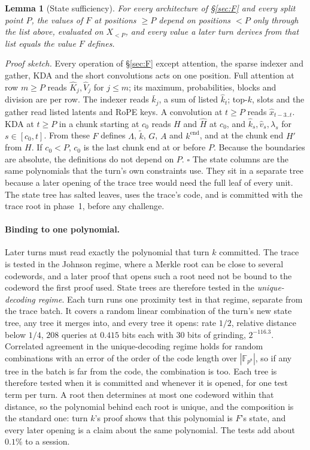 \documentclass[11pt]{article}
\newcommand{\F}{\mathbb{F}}
\newcommand{\Fo}{\F_{p^8}}
\newtheorem{lemma}{Lemma}
\begin{document}
\begin{lemma}[State sufficiency]
\label{lem:suff}
For every architecture of \S\ref{sec:F} and every split point \(P\), the values of \(F\) at positions \(\ge P\) depend on positions \(< P\) only through the list above, evaluated on \(X_{<P}\), and every value a later turn derives from that list equals the value \(F\) defines.
\end{lemma}
\noindent\emph{Proof sketch.}
Every operation of \S\ref{sec:F} except attention, the sparse indexer and gather, KDA and the short convolutions acts on one position.
Full attention at row \(m \ge P\) reads \(\hat K_j, \hat V_j\) for \(j \le m\); its maximum, probabilities, blocks and division are per row.
The indexer reads \(\bar k_j\), a sum of listed \(\hat k_t\); top-\(k\), slots and the gather read listed latents and RoPE keys.
A convolution at \(t \ge P\) reads \(\hat x_{t-3..t}\).
KDA at \(t \ge P\) in a chunk starting at \(c_0\) reads \(H\) and \(\hat H\) at \(c_0\), and \(\hat k_s, \hat v_s, \lambda_s\) for \(s \in [c_0, t]\). From these \(F\) defines \(\Lambda\), \(\tilde k\), \(G\), \(A\) and \(k^{\mathrm{end}}\), and at the chunk end \(H'\) from \(H\).
If \(c_0 < P\), \(c_0\) is the last chunk end at or before \(P\).
Because the boundaries are absolute, the definitions do not depend on \(P\). \(\square\)
The state columns are the same polynomials that the turn's own constraints use.
They sit in a separate tree because a later opening of the trace tree would need the full leaf of every unit.
The state tree has salted leaves, uses the trace's code, and is committed with the trace root in phase~1, before any challenge.

\paragraph{Binding to one polynomial.}
Later turns must read exactly the polynomial that turn \(k\) committed.
The trace is tested in the Johnson regime, where a Merkle root can be close to several codewords, and a later proof that opens such a root need not be bound to the codeword the first proof used.
State trees are therefore tested in the \emph{unique-decoding regime}.
Each turn runs one proximity test in that regime, separate from the trace batch. It covers a random linear combination of the turn's new state tree, any tree it merges into, and every tree it opens: rate \(1/2\), relative distance below \(1/4\), \(208\) queries at \(0.415\) bits each with \(30\) bits of grinding, \(2^{-116.3}\).
Correlated agreement in the unique-decoding regime holds for random combinations with an error of the order of the code length over \(|\Fo|\), so if any tree in the batch is far from the code, the combination is too.
Each tree is therefore tested when it is committed and whenever it is opened, for one test term per turn.
A root then determines at most one codeword within that distance, so the polynomial behind each root is unique, and the composition is the standard one: turn \(k\)'s proof shows that this polynomial is \(F\)'s state, and every later opening is a claim about the same polynomial.
The tests add about \(0.1\%\) to a session.
\end{document}
